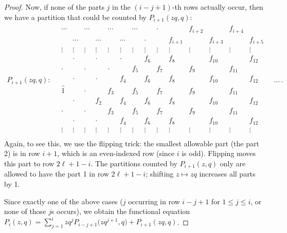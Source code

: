 \documentclass[pdftex]{sigma}
\numberwithin{equation}{section}
\theoremstyle{definition}
\newcommand{\ficone}{{\widehat{1}}}
\begin{document}
\begin{proof}
Now, if none of the parts $j$ in the $(i-j+1)$-th rows actually occur, then we have a partition that could be counted by $P_{i+1}(zq,q)$:
\begin{gather*}
P_{i+1}(zq,q)\colon \quad
\begin{matrix}
\!\cdots\! && \!\cdots\! && \!\cdots\! && \!\cdots\! && \cdot && f_{i+2} && f_{i+4} & \\
& \!\cdots\! && \!\cdots\! && \!\cdots\! && \cdot && f_{i+1} && f_{i+3} && f_{i+5}\\
\vdots & \vdots &\vdots& \vdots &\vdots& \vdots &\vdots& \vdots &\vdots& \vdots &\vdots& \vdots&\vdots& \vdots\\
& \cdot && \cdot && \cdot && f_6 && f_8 && f_{10} && f_{12}\\
\cdot &&\cdot && \cdot && f_5 && f_7 && f_9 && f_{11} & \\
& \cdot && \cdot && f_4 && f_6 && f_8 && f_{10} && f_{12}\\
\ficone &&\cdot && f_3 && f_5 && f_7 && f_9 && f_{11} & \\
& \cdot && f_2 && f_4 && f_6 && f_8 && f_{10} && f_{12}\\
\cdot &&\cdot && f_3 && f_5 && f_7 && f_9 && f_{11} & \\
& \cdot && \cdot && f_4 && f_6 && f_8 && f_{10} && f_{12}\\
\vdots & \vdots &\vdots& \vdots &\vdots& \vdots &\vdots& \vdots &\vdots& \vdots &\vdots& \vdots&\vdots& \vdots\\
 \end{matrix}\quad \dots\,.
\end{gather*}
Again, to see this, we use the flipping trick: the smallest allowable part (the part 2) is in row $i+1$, which is an even-indexed row (since $i$ is odd). Flipping moves this part to row $2\ell+1-i$. The partitions counted by $P_{i+1}(z,q)$ only are allowed to have the part 1 in row $2\ell+1-i$; shifting $z\mapsto zq$ increases all parts by 1.

Since exactly one of the above cases ($j$ occurring in row $i-j+1$ for $1 \le j \le i$, or none of those $j$s occurs), we obtain the functional equation $P_i(z,q) = \sum_{j=1}^i zq^j P_{i-j+1}\bigl(zq^{j+1},q\bigr)+ P_{i+1}(zq,q)$.


\end{proof}
\end{document}
